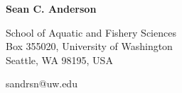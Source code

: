 \documentclass[11pt]{article}
\title{}
\author{}
\date{}
\begin{document}
\begin{spacing}{1}
\thispagestyle{empty}

{\LARGE \textbf{Sean C. Anderson}}\\
\vspace{0.8mm}

School of Aquatic and Fishery Sciences\\
Box 355020, University of Washington\\
Seattle, WA 98195, USA

\vspace{1.1mm}
sandrsn@uw.edu\\

\vspace{-2.1mm}



\end{spacing}
\end{document}

